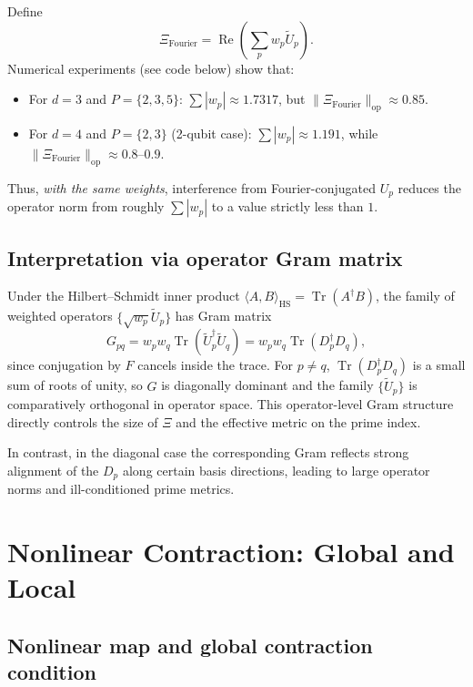 \documentclass[11pt]{article}
\begin{document}
Define
\[
  \Xi_{\text{Fourier}} = \operatorname{Re}\left(\sum_p w_p \tilde{U}_p\right).
\]
Numerical experiments (see code below) show that:
\begin{itemize}
  \item For $d=3$ and $P=\{2,3,5\}$: $\sum |w_p|\approx 1.7317$, but $\|\Xi_{\text{Fourier}}\|_{\mathrm{op}}\approx 0.85$.
  \item For $d=4$ and $P=\{2,3\}$ (2-qubit case): $\sum |w_p|\approx 1.191$, while $\|\Xi_{\text{Fourier}}\|_{\mathrm{op}}\approx 0.8$--$0.9$.
\end{itemize}
Thus, \emph{with the same weights}, interference from Fourier-conjugated $U_p$ reduces the operator norm from roughly $\sum|w_p|$ to a value strictly less than $1$.

\subsection{Interpretation via operator Gram matrix}

Under the Hilbert--Schmidt inner product $\langle A,B\rangle_{\mathrm{HS}} = \operatorname{Tr}(A^\dagger B)$, the family of weighted operators $\{\sqrt{w_p}\tilde{U}_p\}$ has Gram matrix
\[
  G_{pq} = w_p w_q \operatorname{Tr}(\tilde{U}_p^\dagger \tilde{U}_q)
  = w_p w_q \operatorname{Tr}(D_p^\dagger D_q),
\]
since conjugation by $F$ cancels inside the trace. For $p\neq q$, $\operatorname{Tr}(D_p^\dagger D_q)$ is a small sum of roots of unity, so $G$ is diagonally dominant and the family $\{\tilde{U}_p\}$ is comparatively orthogonal in operator space. This operator-level Gram structure directly controls the size of $\Xi$ and the effective metric on the prime index.

In contrast, in the diagonal case the corresponding Gram reflects strong alignment of the $D_p$ along certain basis directions, leading to large operator norms and ill-conditioned prime metrics.

\section{Nonlinear Contraction: Global and Local}

\subsection{Nonlinear map and global contraction condition}
\end{document}
